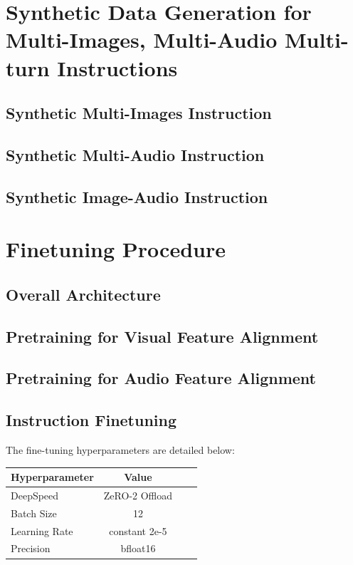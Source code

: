 \documentclass[preprint]{article}
\begin{document}
\section{Synthetic Data Generation for Multi-Images, Multi-Audio Multi-turn Instructions}

\subsection{Synthetic Multi-Images Instruction}

\subsection{Synthetic Multi-Audio Instruction}

\subsection{Synthetic Image-Audio Instruction}

\section{Finetuning Procedure}

\subsection{Overall Architecture}

\subsection{Pretraining for Visual Feature Alignment}

\subsection{Pretraining for Audio Feature Alignment}

\subsection{Instruction Finetuning}

The fine-tuning hyperparameters are detailed below:

\begin{table}[h]
  \centering
  \begin{tabular}{lccl}
    \hline
    \textbf{Hyperparameter} & \textbf{Value} \\
    \hline
    DeepSpeed               & ZeRO-2 Offload \\
    Batch Size              & 12             \\
    Learning Rate           & constant 2e-5  \\
    Precision               & bfloat16       \\
    \hline
  \end{tabular}
\end{table}
\end{document}
